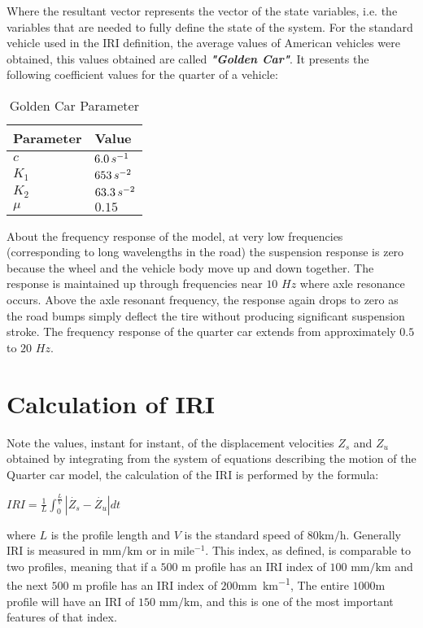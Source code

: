 \documentclass[tesi]{subfiles}
\begin{document}
Where the resultant vector represents the vector of the state variables, i.e. the variables that are needed to fully define the state of the system. 
For the standard vehicle used in the IRI definition, the average values of American vehicles were obtained, this values obtained are called \textbf{\textit{"Golden Car"}}\cite{little_book}.
\clearpage It presents the following coefficient values for the quarter of a vehicle:


\begin{table}[H]\label{table:Golden Car Parameter}
\centering
    \begin{tabular}{ | l | l |}

    \hline
    Parameter  & Value \\ \hline


    $c$ & $6.0 \thinspace s^{-1}$\\ \hline
    $K_{1}$ & $653 \thinspace s^{-2}$\\ \hline
    $K_{2}$ & $63.3 \thinspace s^{-2}$\\ \hline
    $\mu$ & $0.15$\\ \hline

\hline
    \end{tabular}
 \caption{Golden Car Parameter}
\end{table}


About the frequency response of the model, at very low frequencies (corresponding to long wavelengths in the road) the suspension response is zero because the wheel and the vehicle body move up and down together. The response is maintained up through frequencies near $10$ $Hz$ where axle resonance occurs. Above the axle resonant frequency, the response again drops to zero as the road bumps simply deflect the tire without producing significant suspension stroke.
The frequency response of the quarter car extends from approximately $0.5$ to $20$ $Hz$.

\section{Calculation of IRI}\label{sc:Calculation of IRI}
Note the values, instant for instant, of the displacement velocities $Z_{s}$  and $Z_{u}$ obtained by integrating from the system of equations describing the motion of the Quarter car model, the calculation of the IRI is performed by the formula:
\begin{center}
{\LARGE $IRI = \frac{1}{L} \int_{0}^{\frac{L}{V}} | \dot{Z_{s}} - \dot{Z_{u}} | dt$}
\end{center}
where $L$ is the profile length and $V$ is the standard speed of $\num{80} \si{\km\per\hour}$. Generally IRI is measured in $\si{\milli\meter\per\km}$ or in  mile$^{-1}$. This index, as defined, is comparable to two profiles, meaning that if a $500$ $\si{\meter}$ profile has an IRI index of $100$ $\si{\milli\meter\per\km}$ and the next $500$ \thinspace \si{\meter} profile has an IRI index of $200$\thinspace\si{\milli\meter\per\km}, The entire $1000$\si{\meter} profile will have an IRI of $150$ $\si{\milli\meter\per\km}$, and this is one of the most important features\cite{little_book} of that index. 
\end{document}

